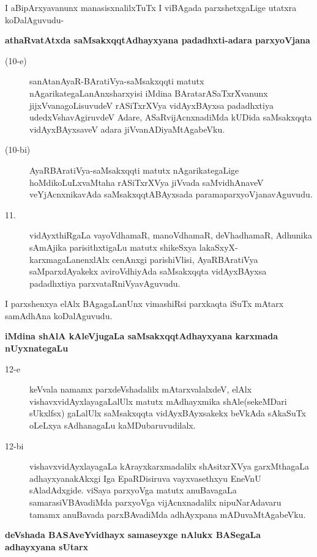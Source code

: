 I aBipArxyavanunx manasisxnalilxTuTx I viBAgada parxshetxgaLige utatxra koDalAgu\-vudu-

{\bigskip
\noindent
{\large\bf athaRvatAtxda saMsakxqqtAdhayxyana padadhxti-adara parxyoVjana}}\label{page4}

\begin{description}
\item[(10-e)] sanAtanAyaR-BAratiVya-saMsakxqqti matutx nAgarikategaLanAnxsharxyisi iMdina BArata\-rASaTxrX\-vanunx jijxVvanagoLisuvudeV rASiTxrXVya vidAyxBAyxsa padadhxtiya udedxVshavAgiruvdeV Adare, ASaR\-vijAcnxna\-diMda kUDida saMsakxqqta vidAyxBAyxsaveV adara jiVvanADiyaMtAgabeVku.

\item[(10-bi)] AyaRBAratiVya-saMsakxqqti matutx nAgarikategaLige hoMdikoLuLx\-vaMtaha rASiTxrXVya jiVvada saMvi\-dhAnaveV veYjAcnxnikavAda saMsakxqqtABAyxsada parama\-parxyoVjanavAguvudu. 

\item[11.] vidAyxthiRgaLa vayoVdhamaR, manoVdhamaR, deVhadhamaR, Adhunika sAmAjika parisithxtigaLu matutx shikeSxya lakaSxyX-karxmagaLanenxlAlx cenAnxgi parishiVlisi, AyaRBAratiVya saMparxdAyakekx avi\-roV\-dhi\-yAda saMsakxqqta vidAyxBAyxsa padadhxtiya parxvataRniVyavAguvudu.
\end{description}

I parxshenxya elAlx BAgagaLanUnx vimashiRsi parxkaqta iSuTx mAtarx samAdhAna koDalAguvudu.

\newpage

{\bigskip
\noindent
{\large\bf iMdina shAlA kAleVjugaLa saMsakxqqtAdhayxyana karxmada nUyxnategaLu}}\label{page43}
\begin{description}
\item[12-e] keVvala namamx parxdeVshadalilx mAtarxvalalxdeV, elAlx vishavxvidAyxlayagaLalUlx matutx mAdhayxmika shAle\-(sekeM\-Dari sUkxlfsx) gaLalUlx saMsakxqqta vidAyxBAyxsakekx beVkAda sAkaSuTx oLeLxya sAdhanagaLu kaMDu\-baruvu\-dilalx.

\item[12-bi] vishavxvidAyxlayagaLa kArayxkarxmadalilx shAsitxrXVya garxMthagaLa adhayxyanakAkxgi Iga EpaRDisiruva \-vayxva\-sethxyu EneVnU sAladAdxgide. viSaya parxyoVga matutx anuBavagaLa samarasiVBAvadiMda parx\-yoVga vijAcnxnadalilx nipuNarAdavaru tamamx anuBavada parxBAvadiMda adhAyxpana mADu\-vaMtAga\-beVku.
\end{description}

{\medskip
\noindent
{\large\bf deVshada BASAveYvidhayx samaseyxge nAlukx BASegaLa adhayxyana sUtarx}}\label{page44}

